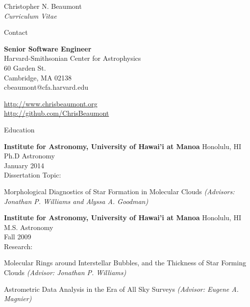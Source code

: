 \documentclass[10pt]{article}
\newenvironment{sublist}{%
	\begin{list}{}{%
		\setlength{\itemsep}{0em}\setlength{\parsep}{0em}%
		\setlength{\topsep}{0em}\setlength{\parskip}{0em}%
	}%
}%
{ \end{list} }
\begin{document}
\date{}


\newlength{\oldcvlabelwidth}
\renewcommand*{\cvbibname}{}

\begin{cv}{Christopher N. Beaumont\\{\large \itshape Curriculum Vitae}}

\begin{cvlist}{Contact}
	\item
	\textbf{Senior Software Engineer} \\
	Harvard-Smithsonian Center for Astrophysics \\
	60 Garden St.\\
	Cambridge, MA 02138\\
	cbeaumont@cfa.harvard.edu

	\item \href{http://www.chrisbeaumont.org}{http://www.chrisbeaumont.org} \\  
	\href{http://github.com/ChrisBeaumont}{http://github.com/ChrisBeaumont}
	
\end{cvlist}

\begin{cvlist}{Education}
	\item \textbf{Institute for Astronomy, University of Hawai'i at Manoa} Honolulu, HI \\
		Ph.D Astronomy \\
		January 2014 \\
		Dissertation Topic: 
		\begin{sublist}
		\item Morphological Diagnostics of Star Formation in Molecular Clouds \emph{(Advisors: Jonathan P. Williams and Alyssa A. Goodman)}
		\end{sublist}
	\item \textbf{Institute for Astronomy, University of Hawai'i at Manoa} Honolulu, HI\\
		M.S. Astronomy\\
		Fall 2009\\
		Research:
		\begin{sublist}
		\item Molecular Rings around Interstellar Bubbles, and the Thickness of Star Forming Clouds \emph{(Advisor: Jonathan P. Williams)}
		\item Astrometric Data Analysis in the Era of All Sky Surveys \emph{(Advisor: Eugene A. Magnier)}
		\end{sublist}
		

\end{cvlist}
\end{cv}
\end{document}
